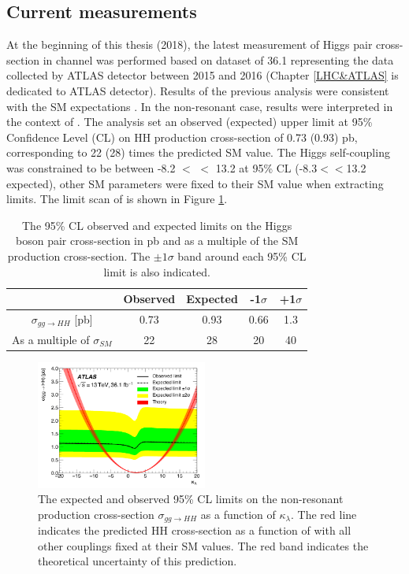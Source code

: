 \subsection{Current measurements}
\label{chap1:HH:CM}
At the beginning of this thesis (2018), the latest measurement of Higgs pair cross-section in \HHyybb channel was performed based on dataset of 36.1 \ifb representing the data collected by ATLAS detector between 2015 and 2016 (Chapter \ref{LHC&ATLAS} is dedicated to ATLAS detector). Results of the previous analysis were consistent with the SM expectations \cite{yybb_36ifb}. In the non-resonant case, results were interpreted in the context of \kl. The analysis set an observed (expected) upper limit at  95\% Confidence Level (CL) on HH production cross-section of 0.73 (0.93) pb, corresponding to 22 (28) times the predicted SM value. The Higgs self-coupling was constrained to be between -8.2 $<$ \kl $<$ 13.2 at 95\% CL (-8.3$<$\kl$<$13.2 expected), other SM parameters were fixed to their SM value when extracting limits. The limit scan of \kl is shown in Figure \ref{fig:chap1:HH:CM:KL}. \\

\begin{table}[htbp]
    \centering
    \begin{tabular}{ccccc}
    \hline
         & Observed & Expected & -1$\sigma$ & +1$\sigma$ \\
    \hline
        $\sigma_{gg\rightarrow HH}$ [pb] & 0.73 & 0.93 & 0.66 & 1.3 \\
        As a multiple of $\sigma_{SM}$ & 22 & 28 & 20 & 40 \\
        \hline
    \end{tabular}
    \caption{The 95\% CL observed and expected limits on the Higgs boson pair cross-section in pb and as a multiple of the SM production cross-section. The $\pm1\sigma$ band around each 95\% CL limit is also indicated.}
    \label{tab:chap1:HH:CM:XSEC}
\end{table}
\begin{figure}[htbp]
    \centering
    \includegraphics[width=0.5\textwidth]{Ch1/Img/kl_36ifb.png}
    \caption{The expected and observed 95\% CL limits on the non-resonant production cross-section $\sigma_{gg\rightarrow HH}$ as a function of $\kappa_{\lambda}$. The red line indicates the predicted HH cross-section as a function of \kl with all other couplings fixed at their SM values. The red band indicates the theoretical uncertainty of this prediction.}
    \label{fig:chap1:HH:CM:KL}
\end{figure}

